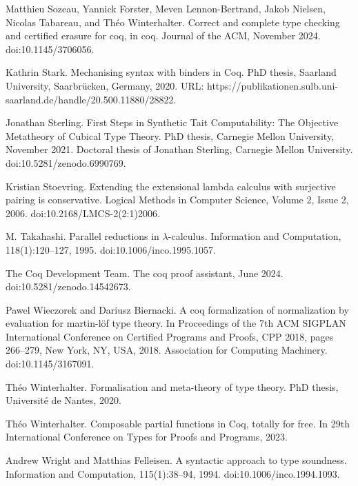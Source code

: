 \par\noindent  [45]  Matthieu Sozeau, Yannick Forster, Meven Lennon-Bertrand, Jakob Nielsen, Nicolas Tabareau, and Théo Winterhalter.  Correct and complete type checking and certified erasure for coq, in coq.  Journal of the ACM, November 2024.  doi:10.1145/3706056.  
 
\par\noindent  [46]  Kathrin Stark.  Mechanising syntax with binders in Coq.  PhD thesis, Saarland University, Saarbrücken, Germany, 2020.  URL: https://publikationen.sulb.uni-saarland.de/handle/20.500.11880/28822.  
 
\par\noindent  [47]  Jonathan Sterling.  First Steps in Synthetic Tait Computability: The Objective Metatheory of Cubical Type Theory.  PhD thesis, Carnegie Mellon University, November 2021.  Doctoral thesis of Jonathan Sterling, Carnegie Mellon University.  doi:10.5281/zenodo.6990769.  
 
\par\noindent  [48]  Kristian Stoevring.  Extending the extensional lambda calculus with surjective pairing is conservative.  Logical Methods in Computer Science, Volume 2, Issue 2, 2006.  doi:10.2168/LMCS-2(2:1)2006.  
 
\par\noindent  [49]  M. Takahashi.  Parallel reductions in $\lambda$-calculus.  Information and Computation, 118(1):120–127, 1995.  doi:10.1006/inco.1995.1057.  
 
\par\noindent  [50]  The Coq Development Team.  The coq proof assistant, June 2024.  doi:10.5281/zenodo.14542673.  
 
\par\noindent  [51]  Pawel Wieczorek and Dariusz Biernacki.  A coq formalization of normalization by evaluation for martin-löf type theory.  In Proceedings of the 7th ACM SIGPLAN International Conference on Certified Programs and Proofs, CPP 2018, pages 266–279, New York, NY, USA, 2018. Association for Computing Machinery.  doi:10.1145/3167091.  
 
\par\noindent  [52]  Théo Winterhalter.  Formalisation and meta-theory of type theory.  PhD thesis, Université de Nantes, 2020.  
 
\par\noindent  [53]  Théo Winterhalter.  Composable partial functions in Coq, totally for free.  In 29th International Conference on Types for Proofs and Programs, 2023.  
 
\par\noindent  [54]  Andrew Wright and Matthias Felleisen.  A syntactic approach to type soundness.  Information and Computation, 115(1):38–94, 1994.  doi:10.1006/inco.1994.1093.  
  
